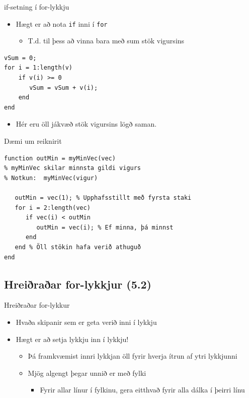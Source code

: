 \documentclass{beamer}
\begin{document}
\begin{frame}[fragile]{if-setning í for-lykkju}
\vspace{\baselineskip}
\begin{itemize}
 \item Hægt er að nota \texttt{if} inni í \texttt{for}
 \begin{itemize}
  \item T.d. til þess að vinna bara með sum stök vigursins
 \end{itemize}
\end{itemize}

\begin{verbatim}
vSum = 0;
for i = 1:length(v)
    if v(i) >= 0
       vSum = vSum + v(i);
    end
end
\end{verbatim}
\begin{itemize}
 \item Hér eru öll jákvæð stök vigursins lögð saman.
\end{itemize}
\end{frame}

\begin{frame}[fragile]{Dæmi um reiknirit}
\vspace{\baselineskip}
\begin{verbatim}
function outMin = myMinVec(vec)
% myMinVec skilar minnsta gildi vigurs
% Notkun:  myMinVec(vigur)
 
   outMin = vec(1); % Upphafsstillt með fyrsta staki
   for i = 2:length(vec)
      if vec(i) < outMin
         outMin = vec(i); % Ef minna, þá minnst
      end
   end % Öll stökin hafa verið athuguð
end
\end{verbatim}
\end{frame}

\subsection{Hreiðraðar for-lykkjur (5.2)}

\begin{frame}[fragile]{Hreiðraðar for-lykkur}
\begin{itemize}
 \item Hvaða skipanir sem er geta verið inni í lykkju
 \item Hægt er að setja lykkju inn í lykkju!
 \begin{itemize}
  \item Þá framkvæmist innri lykkjan öll fyrir hverja ítrun af ytri lykkjunni
  \item Mjög algengt þegar unnið er með fylki
  \begin{itemize}
   \item Fyrir allar línur í fylkinu, gera eitthvað fyrir alla dálka í þeirri línu
  \end{itemize}
 \end{itemize}
\end{itemize}
\end{frame}
\end{document}
